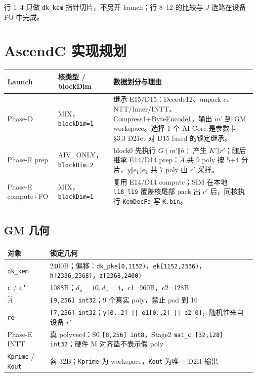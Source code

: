\documentclass[UTF8,a4paper,11pt]{ctexart}
\begin{document}
行 1--4 只做 \texttt{dk\_kem} 指针切片，不另开 launch；行 8--12 的比较与 $J$ 选路在设备 FO 中完成。

\section{AscendC 实现规划}

\begin{longtable}{@{}L{2.8cm}L{3.1cm}L{7.2cm}@{}}
\toprule
Launch & 核类型 / blockDim & 数据划分与理由 \\
\midrule
Phase-D & MIX，\texttt{blockDim=1} & 继承 E15/D15：Decode12、unpack \(c\)、NTT/Inner/INTT、Compress1+ByteEncode1，输出 \(m'\) 到 GM workspace。选择 1 个 AI Core 是参数卡 §3.3 D21ct 对 D15 fused 的锁定继承。 \\
Phase-E prep & AIV\_ONLY，\texttt{blockDim=2} & block0 先执行 \(G(m'\Vert h)\) 产生 \(K'\Vert r'\)；随后继承 E14/D14 prep：\(\hat A\) 共 9 poly 按 5+4 分片，\(y\Vert e_1\Vert e_2\) 共 7 poly 由 \(r'\) 采样。 \\
Phase-E compute+FO & MIX，\texttt{blockDim=1} & 复用 E14/D14 compute；SIM 在本地 \texttt{l18\_l19} 覆盖核尾部 pack 出 \(c'\) 后，同核执行 \texttt{KemDecFo} 写 \texttt{K.bin}。 \\
\bottomrule
\end{longtable}

\subsection{GM 几何}
\begin{longtable}{@{}L{3.8cm}L{9.3cm}@{}}
\toprule
对象 & 锁定几何 \\
\midrule
\texttt{dk\_kem} & 2400B；偏移：\texttt{dk\_pke[0,1152)}，\texttt{ek[1152,2336)}，\texttt{h[2336,2368)}，\texttt{z[2368,2400)} \\
\texttt{c} / \texttt{c'} & 1088B；\(d_u=10,d_v=4\)，c1=960B，c2=128B \\
\(\hat A\) & \texttt{[9,256] int32}；9 个真实 poly，禁止 pad 到 16 \\
\texttt{re} & \texttt{[7,256] int32}；\texttt{y[0..2] || e1[0..2] || e2[0]}，随机性来自设备 \(r'\) \\
Phase-E INTT & 真 polyvec4：S0 \texttt{[8,256] int8}，Stage2 \texttt{mat\_c [32,128] int32}；硬件 M 对齐垫不表示假 poly \\
\texttt{Kprime} / \texttt{Kout} & 各 32B；\texttt{Kprime} 为 workspace，\texttt{Kout} 为唯一 D2H 输出 \\
\bottomrule
\end{longtable}
\end{document}
